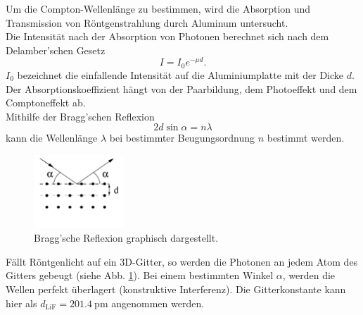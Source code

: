 Um die Compton-Wellenlänge zu bestimmen, wird die Absorption und Transmission von Röntgenstrahlung durch Aluminum untersucht.
\\
Die Intensität nach der Absorption von Photonen berechnet sich nach dem Delamber'schen Gesetz
\begin{equation}
    I = I_0 e^{-\mu d} .
\end{equation}
$I_0$ bezeichnet die einfallende Intensität auf die Aluminiumplatte mit der Dicke $d$.
Der Absorptionskoeffizient hängt von der Paarbildung, dem Photoeffekt und dem Comptoneffekt ab.
\\
Mithilfe der Bragg'schen Reflexion 
\begin{equation}
    2 d \sin \alpha = n \lambda
    \label{eqn:lambdaalpha}
\end{equation}
kann die Wellenlänge $\lambda$ bei bestimmter Beugungsordnung $n$ bestimmt werden.
\begin{figure}
    \centering
    \includegraphics[width=0.3\textwidth]{content/data/kristall.jpg}
    \caption{Bragg'sche Reflexion graphisch dargestellt. \cite[2]{anleitung}}
    \label{fig:bragg}
\end{figure}
Fällt Röntgenlicht auf ein 3D-Gitter, so werden die Photonen an jedem Atom des Gitters gebeugt (siehe Abb. \ref{fig:bragg}).
Bei einem bestimmten Winkel $\alpha$, werden die Wellen perfekt überlagert (konstruktive Interferenz).
Die Gitterkonstante kann hier als $d_\text{LiF}=\SI{201.4}{\pico\metre}$ angenommen werden.